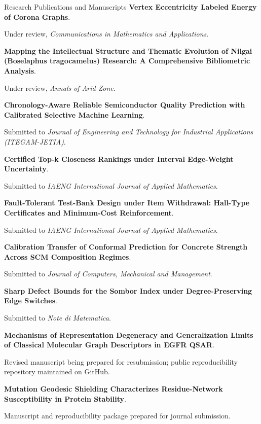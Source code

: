 \begin{rubric}{Research Publications and Manuscripts}
\entry*[2026]%
\textbf{Vertex Eccentricity Labeled Energy of Corona Graphs}.\par
Under review, \emph{Communications in Mathematics and Applications}.

\entry*[2026]%
\textbf{Mapping the Intellectual Structure and Thematic Evolution of Nilgai (Boselaphus tragocamelus) Research: A Comprehensive Bibliometric Analysis}.\par
Under review, \emph{Annals of Arid Zone}.

\entry*[2026]%
\textbf{Chronology-Aware Reliable Semiconductor Quality Prediction with Calibrated Selective Machine Learning}.\par
Submitted to \emph{Journal of Engineering and Technology for Industrial Applications (ITEGAM-JETIA)}.

\entry*[2026]%
\textbf{Certified Top-k Closeness Rankings under Interval Edge-Weight Uncertainty}.\par
Submitted to \emph{IAENG International Journal of Applied Mathematics}.

\entry*[2026]%
\textbf{Fault-Tolerant Test-Bank Design under Item Withdrawal: Hall-Type Certificates and Minimum-Cost Reinforcement}.\par
Submitted to \emph{IAENG International Journal of Applied Mathematics}.

\entry*[2026]%
\textbf{Calibration Transfer of Conformal Prediction for Concrete Strength Across SCM Composition Regimes}.\par
Submitted to \emph{Journal of Computers, Mechanical and Management}.

\entry*[2026]%
\textbf{Sharp Defect Bounds for the Sombor Index under Degree-Preserving Edge Switches}.\par
Submitted to \emph{Note di Matematica}.


\entry*[2026]%
\textbf{Mechanisms of Representation Degeneracy and Generalization Limits of Classical Molecular Graph Descriptors in EGFR QSAR}.\par
Revised manuscript being prepared for resubmission; public reproducibility repository maintained on GitHub.

\entry*[2026]%
\textbf{Mutation Geodesic Shielding Characterizes Residue-Network Susceptibility in Protein Stability}.\par
Manuscript and reproducibility package prepared for journal submission.

\end{rubric}
